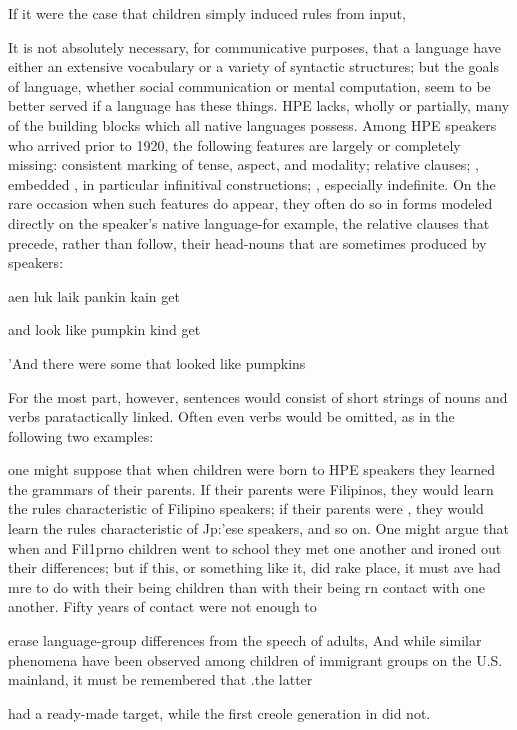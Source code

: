 If it were the case that children simply induced rules from input,

It is not absolutely necessary, for communicative purposes, that a language have either an extensive vocabulary or a variety of syntactic structures; but the goals of language, whether social communication or mental computation, seem to be better served if a language has these things. HPE lacks, wholly or partially, many of the building blocks which all native languages possess. Among HPE speakers who arrived prior to 1920, the following features are largely or completely missing: consistent marking of tense, aspect, and modality; relative clauses; , embedded , in particular infinitival con\-structions; , especially indefinite. On the rare occasion when such features do appear, they often do so in forms modeled directly on the speaker's native language{}-for example, the relative clauses that precede, rather than follow, their head-nouns that are sometimes produced by  speakers:

\ea\label{ex:14}
 aen luk laik pankin kain get
\glt
\z

and look like pumpkin kind get

'And there were some that looked like pumpkins

For the most part, however, sentences would consist of short strings of nouns and verbs paratactically linked. Often even verbs would be omitted, as in the following two examples:


one might suppose that when children were born to HPE speakers they learned the grammars of their parents. If their parents were Filipinos, they would learn the rules characteristic of Filipino speakers; if their parents were , they would learn the rules characteristic of Jp{\textquotedbl}:'ese speakers, and so on. One might argue that when  and Fil1prno children went to school they met one another and ironed out their differences; but if this, or something like it, did rake place, it must ave had mre to do with their being children than with their being rn contact with one another. Fifty years of contact were not enough to

erase language-group differences from the speech of adults, And while similar phenomena have been observed among children of immigrant groups on the U.S. mainland, it must be remembered that .the latter

had a ready-made target, while the first creole generation in  did not.

